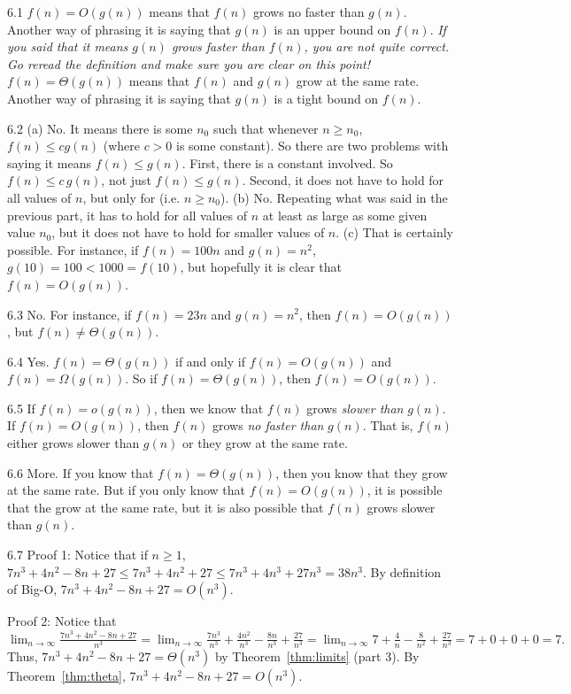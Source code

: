 \begin{RequAnswer}{6.1}
$f(n)=O(g(n))$ means that $f(n)$ grows no faster than $g(n)$.
Another way of phrasing it is saying that $g(n)$ is an upper bound on $f(n)$.
{\em If you said that it means $g(n)$ grows faster than $f(n)$, you are not quite correct.
Go reread the definition and make sure you are clear on this point!}
$f(n)=\Theta(g(n))$ means that $f(n)$ and $g(n)$ grow at the same rate.
Another way of phrasing it is saying that $g(n)$ is a tight bound on $f(n)$.
\end{RequAnswer}
\begin{RequAnswer}{6.2}
(a) No. It means there is some $n_0$ such that whenever $n\geq n_0$, $f(n)\leq c g(n)$ (where $c>0$ is some constant).
So there are two problems with saying it means $f(n)\leq g(n)$. First, there is a constant involved.
So $f(n)\leq c\, g(n)$, not just $f(n)\leq g(n)$. Second, it does not have to hold for all values of $n$,
but only for (i.e. $n\geq n_0$).
(b) No. Repeating what was said in the previous part, it has to hold for all values of $n$ at least as large as some
given value $n_0$, but it does not have to hold for smaller values of $n$.
(c) That is certainly possible. For instance, if $f(n)=100n$ and $g(n)=n^2$, $g(10)=100<1000=f(10)$,
but hopefully it is clear that $f(n)=O(g(n))$.
\end{RequAnswer}
\begin{RequAnswer}{6.3}
No. For instance, if $f(n)=23n$ and $g(n)=n^2$,  then $f(n)=O(g(n))$, but  $f(n)\not=\Theta(g(n))$.
\end{RequAnswer}
\begin{RequAnswer}{6.4}
Yes. $f(n)=\Theta(g(n))$ if and only if $f(n)=O(g(n))$ and $f(n)=\Omega(g(n))$.
So if $f(n)=\Theta(g(n))$, then $f(n)=O(g(n))$.
\end{RequAnswer}
\begin{RequAnswer}{6.5}
If $f(n)=o(g(n))$, then we know that $f(n)$ grows {\em slower than} $g(n)$.
If $f(n)=O(g(n))$, then $f(n)$ grows {\em no faster than} $g(n)$.
That is, $f(n)$ either grows slower than $g(n)$ or they grow at the same rate.
\end{RequAnswer}
\begin{RequAnswer}{6.6}
More. If you know that $f(n)=\Theta(g(n))$, then you know that they grow at the same rate.
But if you only know that $f(n)=O(g(n))$, it is possible that the grow at the same rate, but it is also possible
that $f(n)$ grows slower than $g(n)$.
\end{RequAnswer}
\begin{RequAnswer}{6.7}
Proof 1:
Notice that if $n\geq 1$, $7n^3+4n^2-8n+27\leq 7n^3+4n^2+27 \leq 7n^3+4n^3+27n^3=38n^3$.
By definition of Big-O, $7n^3+4n^2-8n+27=O(n^3)$.

\noindent
Proof 2: Notice that
$\displaystyle \lim_{n\rightarrow\infty} \frac{7n^3+4n^2-8n+27}{n^3} =
\lim_{n\rightarrow\infty} \frac{7n^3}{n^3}+\frac{4n^2}{n^3}-\frac{8n}{n^3}+\frac{27}{n^3}
=\lim_{n\rightarrow\infty} 7+\frac{4}{n}-\frac{8}{n^2}+\frac{27}{n^3}
=7+0+0+0=7.$
Thus, $7n^3+4n^2-8n+27=\Theta(n^3)$ by Theorem~\ref{thm:limits} (part 3).
By Theorem~\ref{thm:theta}, $7n^3+4n^2-8n+27=O(n^3)$.
\end{RequAnswer}
